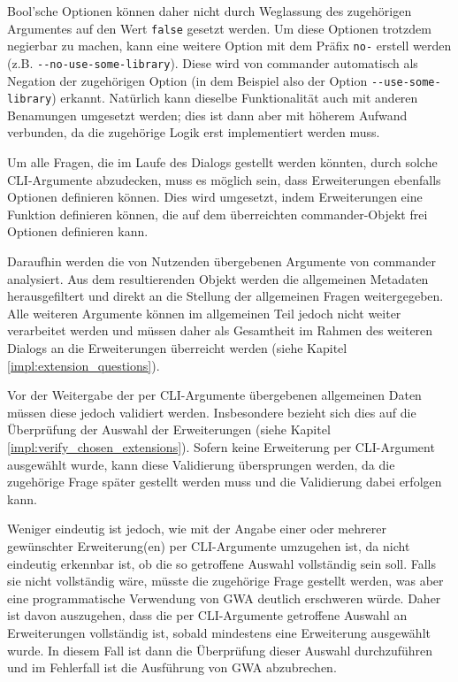 Bool'sche Optionen können daher nicht durch Weglassung des zugehörigen Argumentes auf den Wert \verb|false| gesetzt werden. Um diese Optionen trotzdem negierbar zu machen, kann eine weitere Option mit dem Präfix \verb|no-| erstell werden (z.B. \linebreak \verb|--no-use-some-library|). Diese wird von commander automatisch als Negation der zugehörigen Option (in dem Beispiel also der Option \verb|--use-some-library|) erkannt. Natürlich kann dieselbe Funktionalität auch mit anderen Benamungen umgesetzt werden; dies ist dann aber mit höherem Aufwand verbunden, da die zugehörige Logik erst implementiert werden muss.

Um alle Fragen, die im Laufe des Dialogs gestellt werden könnten, durch solche \gls{CLI}-Argumente abzudecken, muss es möglich sein, dass Erweiterungen ebenfalls Optionen definieren können. Dies wird umgesetzt, indem Erweiterungen eine Funktion definieren können, die auf dem überreichten commander-Objekt frei Optionen definieren kann.

Daraufhin werden die von Nutzenden übergebenen Argumente von commander analysiert. Aus dem resultierenden Objekt werden die allgemeinen Metadaten herausgefiltert und direkt an die Stellung der allgemeinen Fragen weitergegeben. Alle weiteren Argumente können im allgemeinen Teil jedoch nicht weiter verarbeitet werden und müssen daher als Gesamtheit im Rahmen des weiteren Dialogs an die Erweiterungen überreicht werden (siehe Kapitel \ref{impl:extension_questions}).

Vor der Weitergabe der per \gls{CLI}-Argumente übergebenen allgemeinen Daten müssen diese jedoch validiert werden. Insbesondere bezieht sich dies auf die Überprüfung der Auswahl der Erweiterungen (siehe Kapitel \ref{impl:verify_chosen_extensions}). Sofern keine Erweiterung per \gls{CLI}-Argument ausgewählt wurde, kann diese Validierung übersprungen werden, da die zugehörige Frage später gestellt werden muss und die Validierung dabei erfolgen kann.

Weniger eindeutig ist jedoch, wie mit der Angabe einer oder mehrerer gewünschter Erweiterung(en) per \gls{CLI}-Argumente umzugehen ist, da nicht eindeutig erkennbar ist, ob die so getroffene Auswahl vollständig sein soll. Falls sie nicht vollständig wäre, müsste die zugehörige Frage gestellt werden, was aber eine programmatische Verwendung von \gls{GWA} deutlich erschweren würde. Daher ist davon auszugehen, dass die per \gls{CLI}-Argumente getroffene Auswahl an Erweiterungen vollständig ist, sobald mindestens eine Erweiterung ausgewählt wurde. In diesem Fall ist dann die Überprüfung dieser Auswahl durchzuführen und im Fehlerfall ist die Ausführung von \gls{GWA} abzubrechen.

